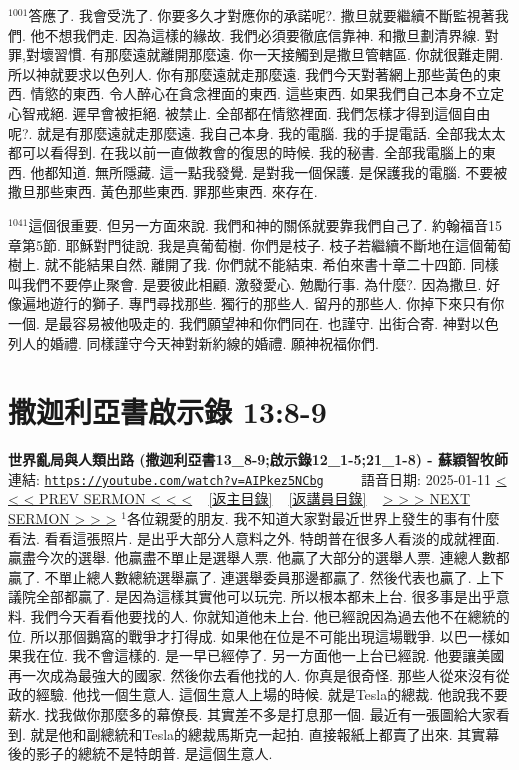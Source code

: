 \documentclass{book}
\begin{document}
$^{1001}$答應了.
我會受洗了.
你要多久才對應你的承諾呢?.
撒旦就要繼續不斷監視著我們.
他不想我們走.
因為這樣的緣故.
我們必須要徹底信靠神.
和撒旦劃清界線.
對罪,對壞習慣.
有那麼遠就離開那麼遠.
你一天接觸到是撒旦管轄區.
你就很難走開.
所以神就要求以色列人.
你有那麼遠就走那麼遠.
我們今天對著網上那些黃色的東西.
情慾的東西.
令人醉心在貪念裡面的東西.
這些東西.
如果我們自己本身不立定心智戒絕.
遲早會被拒絕.
被禁止.
全部都在情慾裡面.
我們怎樣才得到這個自由呢?.
就是有那麼遠就走那麼遠.
我自己本身.
我的電腦.
我的手提電話.
全部我太太都可以看得到.
在我以前一直做教會的復思的時候.
我的秘書.
全部我電腦上的東西.
他都知道.
無所隱藏.
這一點我發覺.
是對我一個保護.
是保護我的電腦.
不要被撒旦那些東西.
黃色那些東西.
罪那些東西.
來存在.

$^{1041}$這個很重要.
但另一方面來說.
我們和神的關係就要靠我們自己了.
約翰福音15章第5節.
耶穌對門徒說.
我是真葡萄樹.
你們是枝子.
枝子若繼續不斷地在這個葡萄樹上.
就不能結果自然.
離開了我.
你們就不能結束.
希伯來書十章二十四節.
同樣叫我們不要停止聚會.
是要彼此相顧.
激發愛心.
勉勵行事.
為什麼?.
因為撒旦.
好像遍地遊行的獅子.
專門尋找那些.
獨行的那些人.
留丹的那些人.
你掉下來只有你一個.
是最容易被他吸走的.
我們願望神和你們同在.
也謹守.
出街合寄.
神對以色列人的婚禮.
同樣謹守今天神對新約線的婚禮.
願神祝福你們.
\newpage



\section{撒迦利亞書啟示錄 13:8-9}
\label{sec:AIPkez5NCbg}
\textbf{世界亂局與人類出路 (撒迦利亞書13\_8-9;啟示錄12\_1-5;21\_1-8) -  蘇穎智牧師}
\newline
\newline
連結: \href{https://youtube.com/watch?v=AIPkez5NCbg}{\texttt{https://youtube.com/watch?v=AIPkez5NCbg}} ~~~~ 語音日期: 2025-01-11
\newline
\newline
\hyperref[sec:QwQqFfjJiJo]{< < < PREV SERMON < < <}
~
\hyperlink{toc}{[返主目錄]}
~
\hyperref[ch:preacher9]{[返講員目錄]}
~
\hyperref[sec:prT7wwZLltI]{> > > NEXT SERMON > > >}
\newline
\newline
$^{1}$各位親愛的朋友.
我不知道大家對最近世界上發生的事有什麼看法.
看看這張照片.
是出乎大部分人意料之外.
特朗普在很多人看淡的成就裡面.
贏盡今次的選舉.
他贏盡不單止是選舉人票.
他贏了大部分的選舉人票.
連總人數都贏了.
不單止總人數總統選舉贏了.
連選舉委員那邊都贏了.
然後代表也贏了.
上下議院全部都贏了.
是因為這樣其實他可以玩完.
所以根本都未上台.
很多事是出乎意料.
我們今天看看他要找的人.
你就知道他未上台.
他已經說因為過去他不在總統的位.
所以那個鵝窩的戰爭才打得成.
如果他在位是不可能出現這場戰爭.
以巴一樣如果我在位.
我不會這樣的.
是一早已經停了.
另一方面他一上台已經說.
他要讓美國再一次成為最強大的國家.
然後你去看他找的人.
你真是很奇怪.
那些人從來沒有從政的經驗.
他找一個生意人.
這個生意人上場的時候.
就是Tesla的總裁.
他說我不要薪水.
找我做你那麼多的幕僚長.
其實差不多是打息那一個.
最近有一張圖給大家看到.
就是他和副總統和Tesla的總裁馬斯克一起拍.
直接報紙上都賣了出來.
其實幕後的影子的總統不是特朗普.
是這個生意人.
\end{document}
